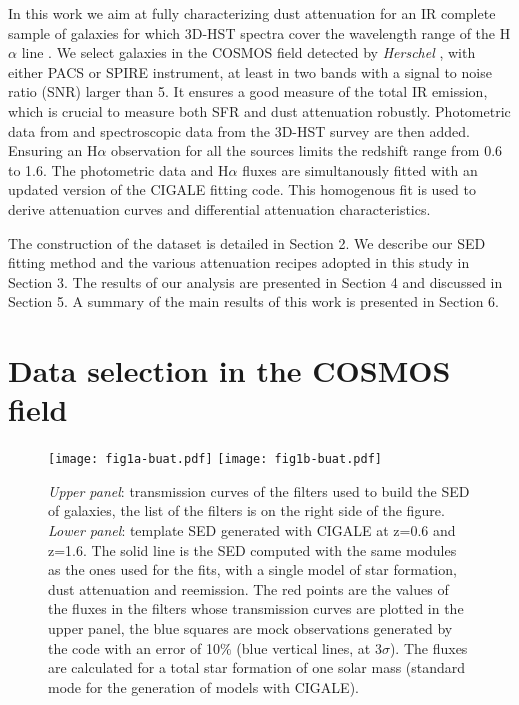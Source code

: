 \documentclass{aa}
\begin{document}
 In this work we  aim at  fully characterizing  dust attenuation  for   an IR complete sample of galaxies for which 3D-HST spectra cover the wavelength range of  the   H$\alpha$ line \citep{Momcheva16}.  We select galaxies in the COSMOS field  detected by {\it Herschel} \citep{Pilbratt10}, with either PACS \citep{Poglitsch10} or SPIRE \citep{Griffin10} instrument, at least in two bands with a signal to noise ratio (SNR) larger than 5. It ensures a good measure of the total IR emission, which is crucial to measure both  SFR and dust attenuation robustly. Photometric data from \citet{Laigle16} and spectroscopic data from the 3D-HST survey are then added. Ensuring an H$\alpha$ observation for all the sources limits the redshift range from 0.6 to 1.6. The photometric data and H$\alpha$ fluxes are simultanously fitted with an updated version of the CIGALE fitting code. This homogenous fit  is used to derive attenuation curves and differential attenuation characteristics. 
 
 The construction of the dataset is detailed in Section 2. We describe our SED fitting method and the various attenuation recipes adopted in this study in Section 3. The results of our analysis are presented  in Section 4 and discussed in Section 5. A summary of the main results  of this work is presented in Section 6.


\section{Data selection in the COSMOS field}
\begin{figure*}
\texttt{[image: fig1a-buat.pdf]}
\texttt{[image: fig1b-buat.pdf]}
\caption{{{\it Upper panel}: transmission curves of the filters used to build the SED of  galaxies, the list of the filters  is on the right side of the figure. {\it Lower panel}: template SED generated with CIGALE   at z=0.6 and z=1.6. The solid line is the SED computed with the same modules as the ones used for the fits, with a single model of star formation, dust attenuation and reemission. The red points are the values of the fluxes in the filters whose transmission curves are plotted in the upper panel, the blue squares are mock observations generated by the code with an error of 10$\%$ (blue vertical lines, at 3$\sigma$). The fluxes are calculated for a total star formation of one solar mass (standard mode for the generation of models with CIGALE).}}
	\label{filters}
\end{figure*} 
\end{document}
